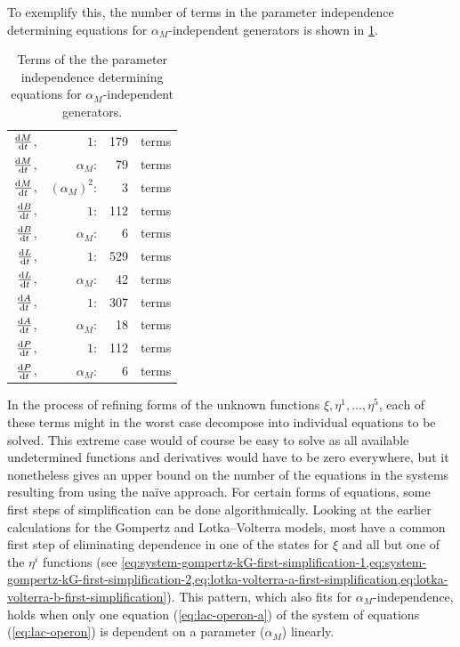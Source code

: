 To exemplify this, the number of terms in the parameter independence determining equations for \(\alpha_M\)-independent generators is shown in \cref{tab:lac-operon-parameter-independence-terms}.
\begin{table}
  \centering
  \begin{tabular}{r@{ }rr@{ }l}
    \(\diff{M}{t}\),& \(1\):& 179& terms \\[1em]
    \(\diff{M}{t}\),& \(\alpha_M\):& 79& terms \\
    \(\diff{M}{t}\),& \(\left(\alpha_M\right)^2\):& 3& terms \\
    \(\diff{B}{t}\),& \(1\):& 112& terms \\
    \(\diff{B}{t}\),& \(\alpha_M\):& 6& terms \\
    \(\diff{L}{t}\),& \(1\):& 529& terms \\
    \(\diff{L}{t}\),& \(\alpha_M\):& 42& terms \\
    \(\diff{A}{t}\),& \(1\):& 307& terms \\
    \(\diff{A}{t}\),& \(\alpha_M\):& 18& terms \\
    \(\diff{P}{t}\),& \(1\):& 112& terms \\
    \(\diff{P}{t}\),& \(\alpha_M\):& 6& terms
  \end{tabular}
  \caption{Terms of the the parameter independence determining equations for \(\alpha_M\)-independent generators.}
  \label{tab:lac-operon-parameter-independence-terms}
\end{table}
In the process of refining forms of the unknown functions \(\xi, \eta^1, \dots, \eta^5\), each of these terms might in the worst case decompose into individual equations to be solved.
This extreme case would of course be easy to solve as all available undetermined functions and derivatives would have to be zero everywhere, but it nonetheless gives an upper bound on the number of the equations in the systems resulting from using the naïve approach.
For certain forms of equations, some first steps of simplification can be done algorithmically.
Looking at the earlier calculations for the Gompertz and Lotka--Volterra models, most have a common first step of eliminating dependence in one of the states for \(\xi\) and all but one of the \(\eta^i\) functions (see \cref{eq:system-gompertz-kG-first-simplification-1,eq:system-gompertz-kG-first-simplification-2,eq:lotka-volterra-a-first-simplification,eq:lotka-volterra-b-first-simplification}).
This pattern, which also fits for \(\alpha_M\)-independence, holds when only one equation (\cref{eq:lac-operon-a}) of the system of equations (\cref{eq:lac-operon}) is dependent on a parameter (\(\alpha_M\)) linearly.
